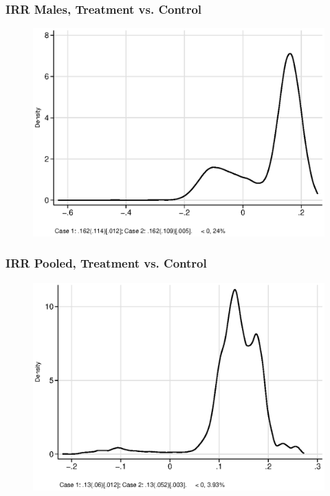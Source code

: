 \documentclass[static]{JJH-Beamer}
\begin{document}
\begin{frame}
\frametitle{IRR Males, Treatment vs. Control} 
\begin{figure}
	\includegraphics[width=.8\columnwidth]{output/irr_2_sexm.eps}
\end{figure}
\end{frame}


\begin{frame}
\frametitle{IRR Pooled, Treatment vs. Control} 
\begin{figure}
	\includegraphics[width=.8\columnwidth]{output/irr_2_sexp.eps}
\end{figure}
\end{frame}

\end{document}
